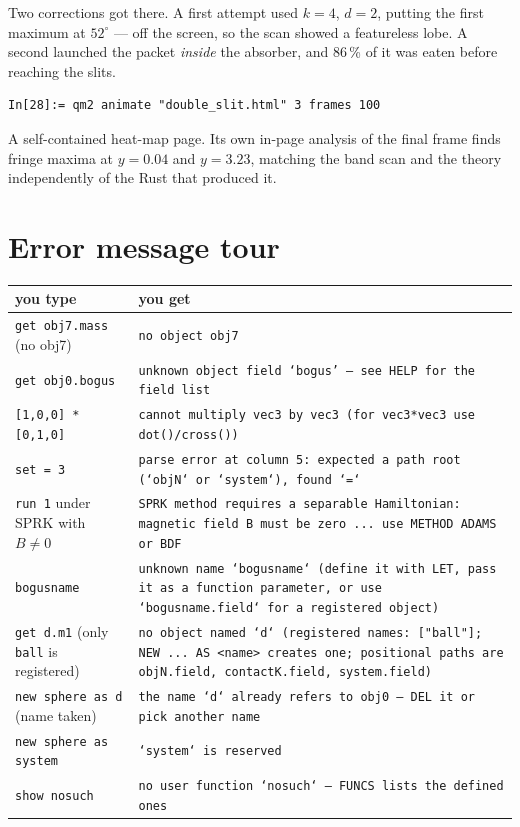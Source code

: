 \documentclass[11pt]{article}
\newcommand{\code}[1]{\texttt{#1}}
\begin{document}
Two corrections got there. A first attempt used $k=4$, $d=2$, putting the
first maximum at $52^\circ$ --- off the screen, so the scan showed a
featureless lobe. A second launched the packet \emph{inside} the
absorber, and 86\,\% of it was eaten before reaching the slits.

\begin{lstlisting}
In[28]:= qm2 animate "double_slit.html" 3 frames 100
\end{lstlisting}

A self-contained heat-map page. Its own in-page analysis of the final
frame finds fringe maxima at $y=0.04$ and $y=3.23$, matching the band
scan and the theory independently of the Rust that produced it.

\section{Error message tour}

\begin{center}
\begin{tabular}{p{5.4cm}p{9.2cm}}
\textbf{you type} & \textbf{you get}\\\hline
\code{get obj7.mass} (no obj7) & \code{no object obj7}\\
\code{get obj0.bogus} & \code{unknown object field `bogus' --- see HELP for the field list}\\
\code{[1,0,0] * [0,1,0]} & \code{cannot multiply vec3 by vec3 (for vec3*vec3 use dot()/cross())}\\
\code{set = 3} & \code{parse error at column 5: expected a path root (`objN` or `system`), found `=`}\\
\code{run 1} under SPRK with $B\ne0$ & \code{SPRK method requires a separable Hamiltonian: magnetic field B must be zero ... use METHOD ADAMS or BDF}\\
\code{bogusname} & \code{unknown name `bogusname` (define it with LET, pass it as a function parameter, or use `bogusname.field` for a registered object)}\\
\code{get d.m1} (only \code{ball} is registered) & \code{no object named `d` (registered names: ["ball"]; NEW ... AS <name> creates one; positional paths are objN.field, contactK.field, system.field)}\\
\code{new sphere as d} (name taken) & \code{the name `d` already refers to obj0 --- DEL it or pick another name}\\
\code{new sphere as system} & \code{`system` is reserved}\\
\code{show nosuch} & \code{no user function `nosuch` --- FUNCS lists the defined ones}\\
\end{tabular}
\end{center}
\end{document}
